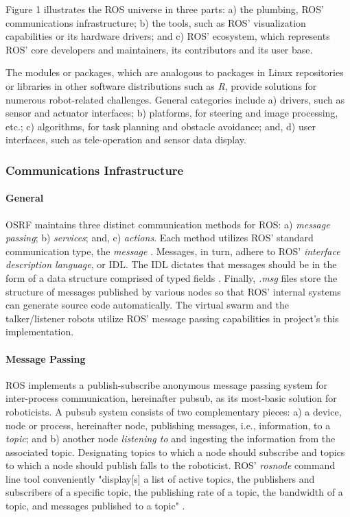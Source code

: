 \documentclass[9pt,twocolumn,twoside]{../../styles/osajnl}
\begin{document}
Figure 1 illustrates the ROS universe in three parts: a) the plumbing, ROS' communications infrastructure; b) the tools, such as ROS' visualization capabilities or its hardware drivers; and c) ROS' ecosystem, which represents ROS' core developers and maintainers, its contributors and its user base.

The modules or packages, which are analogous to packages in Linux repositories or libraries in other software distributions such as \textit{R}, provide solutions for numerous robot-related challenges.  General categories include a) drivers, such as sensor and actuator interfaces; b) platforms, for steering and image processing, etc.; c) algorithms, for task planning and obstacle avoidance; and, d) user interfaces, such as tele-operation and sensor data display. \cite{www-software-categories}

\subsubsection{Communications Infrastructure}
\paragraph{General}
OSRF maintains three distinct communication methods for ROS: a) \textit{message passing}; b) \textit{services}; and, c) \textit{actions}.  Each method utilizes ROS' standard communication type, the \textit{message} \cite{www-ros-core-components}.  Messages, in turn, adhere to ROS' \textit{interface description language}, or IDL. The IDL dictates that messages should be in the form of a data structure comprised of typed fields \cite{www-ros-messages}. Finally, \textit{.msg} files store the structure of messages published by various nodes so that ROS' internal systems can generate source code automatically.  The virtual swarm and the talker/listener robots utilize ROS' message passing capabilities in project's this implementation.

\paragraph{Message Passing}
ROS implements a publish-subscribe anonymous message passing system for inter-process communication, hereinafter pubsub, as its most-basic solution for roboticists.  A pubsub system consists of two complementary pieces: a) a device, node or process, hereinafter node, publishing messages, i.e., information, to a \textit{topic}; and b) another node \textit{listening to} and ingesting the information from the associated topic.  Designating topics to which a node should subscribe and topics to which a node should publish falls to the roboticist.  ROS' \textit{rosnode} command line tool conveniently "display[s] a list of active topics, the publishers and subscribers of a specific topic, the publishing rate of a topic, the bandwidth of a topic, and messages published to a topic" \cite{www-ros-rostopic}.
\end{document}
